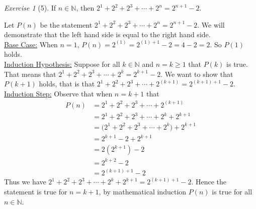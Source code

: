 \documentclass[12pt]{amsart}
\makeatletter
\theoremstyle{remark}
\newtheorem*{exercise}{Exercise}%
\def\NN{\ensuremath{\mathbb N}}
\renewenvironment{proof}[1][\proofname]{\par\doublespacing
  \pushQED{\qed}%
  \normalfont \topsep6\p@\@plus6\p@\relax
  \list{}{%
    \settowidth{\leftmargin}{\itshape\proofname:\hskip\labelsep}%
    \setlength{\labelwidth}{0pt}%
    \setlength{\itemindent}{-\leftmargin}%
  }%
  \item[\hskip\labelsep\itshape#1\@addpunct{:}]\ignorespaces
}{%
  \popQED\endlist\@endpefalse
  \singlespacing
}
\theoremstyle{mycomment}
\makeatother
\begin{document}
\begin{exercise}[5] If $n\in\NN$, then $2^{1}+2^{2}+2^{3}+\cdots+2^{n}=2^{n+1}-2$.
\begin{proof}%
  Let $P(n)$ be the statement $2^{1}+2^{2}+2^{3}+\cdots+2^{n}=2^{n+1}-2$. We will demonstrate that the left hand side is equal to the right hand side.\\
  \underline{Base Case:} When $n = 1$, $P(n) = 2^{(1)} = 2^{(1)+1} - 2 = 4 - 2 = 2$. So $P(1)$ holds. \\
  \underline{Induction Hypothesis:} Suppose for all $k\in\NN$ and $n = k \geq 1$ that $P(k)$ is true. That means that $2^{1}+2^{2}+2^{3}+\cdots+2^{k}=2^{k+1}-2$. We want to show that $P(k+1)$ holds, that is that $2^{1}+2^{2}+2^{3}+\cdots+2^{(k+1)}=2^{(k+1)+1}-2$. \\
  \underline{Induction Step:} Observe that when $n = k+1$ that 
  \begin{align*}
    P(n) &= 2^{1} + 2^{2}+2^{3} + \cdots + 2^{(k+1)} \\
         &= 2^{1} + 2^{2} + 2^{3} + \cdots + 2^{k} + 2^{k+1} \\
         &= \biggl(2^{1} + 2^{2} + 2^{3} + \cdots + 2^{k}\biggr) + 2^{k+1} \\
         &= 2^{k+1} - 2 + 2^{k+1} \\
         &= 2(2^{k+1}) - 2 \\
         &= 2^{k+2} - 2 \\
         &= 2^{(k+1)+1} - 2
  \end{align*}
  Thus we have $2^{1} + 2^{2} + 2^{3} + \cdots + 2^{k} + 2^{k+1} = 2^{(k+1)+1} - 2$. Hence the statement is true for $n = k+1$, by mathematical induction $P(n)$ is true for all $n \in \NN$.
\end{proof}
\end{exercise}
\end{document}
